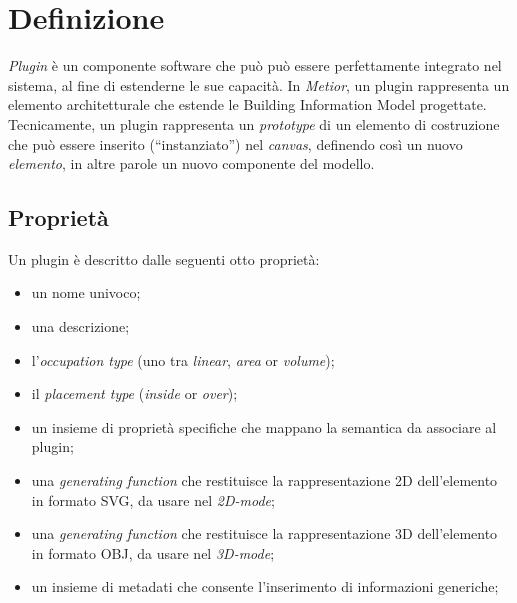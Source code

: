 \section{Definizione}
\label{sec:chapter_3_section_1}

\emph{Plugin} \`e un componente software che pu\`o può essere perfettamente integrato nel sistema, al fine di estenderne
le sue capacità.
In \emph{Metior}, un plugin rappresenta un elemento architetturale che estende le Building Information Model progettate.
Tecnicamente, un plugin rappresenta un \emph{prototype} di un elemento di
costruzione che può essere inserito (``instanziato'') nel \emph{canvas}, definendo cos\`i un nuovo \emph{elemento},
in altre parole un nuovo componente del modello.
\newpage

\subsection*{Proprietà}
\noindent
Un plugin \`e descritto dalle seguenti otto propriet\`a:
\begin{itemize}
  \item un nome univoco;
  \item una descrizione;
  \item l'\emph{occupation type} (uno tra \emph{linear}, \emph{area} or \emph{volume});
  \item il \emph{placement type} (\emph{inside} or \emph{over});
  \item un insieme di proprietà specifiche che mappano la semantica da associare al plugin;
  \item  una \emph{generating function} che restituisce la rappresentazione 2D dell'elemento in formato SVG, da usare nel \emph{2D-mode};
  \item  una \emph{generating function} che restituisce la rappresentazione 3D dell'elemento in formato OBJ, da usare nel  \emph{3D-mode};
  \item un insieme di metadati che consente l'inserimento di informazioni generiche;
\end{itemize}
